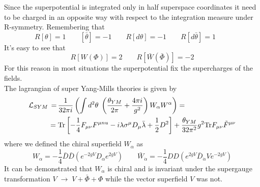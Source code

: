 \begin{appendices}
Since the superpotential is integrated only in half superspace coordinates it need to be charged in an opposite way with respect to the integration measure under R-symmetry.
Remembering  that
\begin{equation}
R[\theta] = 1 \qquad [\bar{\theta}] = - 1 \qquad R[d\theta] = -1 \qquad R [d \bar{\theta}] = 1 \qquad
\end{equation}
It's easy to see that 
\begin{equation}
R[W(\Phi)] = 2 \qquad R[\bar{W}(\bar{\Phi})] = -2
\end{equation}
For this reason in most situations the superpotential fix the supercharges of the fields.
\\
The lagrangian of super Yang-Mills theories is given by
\begin{align}
\mathcal{L}_{SYM} \, = \, & \frac{1}{32 \pi i  } \left( \int d^2 \theta \; \left( \frac{\theta_{YM}}{2 \pi}   + \frac{4 \pi i}{g^2} \right) W_{\alpha} W^{\alpha} \right) 
= 
\\
= \; & \hbox{Tr} \left[ -\frac{1}{4} F_{ \mu \nu} F^{\mu nu } - i \lambda \sigma^{\mu} D_{\mu} \bar{\lambda}  + \frac{1}{2} D^2 \right] + \frac{\theta_{YM}}{32 \pi^2 }g^2 \hbox{Tr} F_{ \mu \nu} \tilde{F}^{\mu \nu } 
\end{align}
where we defined the chiral superfield $W_{\alpha}$ as
\begin{equation}
 W_{\alpha} = - \frac{1}{4} \bar{D} \bar{D}\left(e^{-2 g V}  D_{\alpha}  e^{2g V} \right) \qquad  
\bar{W}_{\dot{\alpha}} = - \frac{1}{4} D D \left(   e^{2gV} \bar{D}_{\dot{\alpha}} V e^{-2gV} \right)  
\end{equation}
It can be demonstrated that $W_{\alpha}$ is chiral and is invariant under the supergauge transformation $V \; \rightarrow \; V + \bar{\Phi} + \Phi$ while the vector superfield $V$ was not.


\end{appendices}
